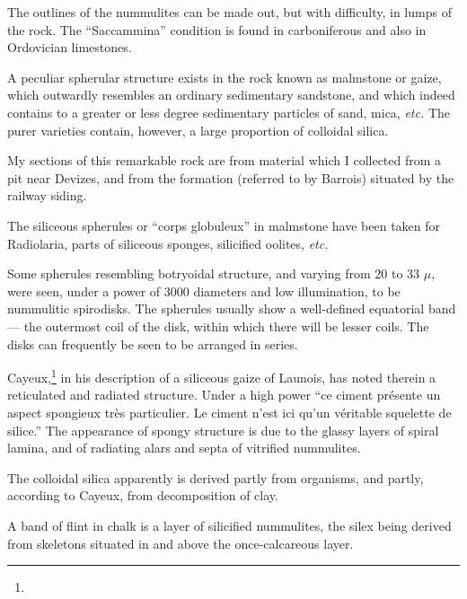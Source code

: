 \documentclass[a4paper, 12pt, oneside]{article}
\begin{document}
The outlines of the nummulites can be made out, but with difficulty, in lumps of the rock. The ``Saccammina'' condition is found in carboniferous and also in Ordovician limestones.

A peculiar spherular structure exists in the rock known as malmstone or gaize, which outwardly resembles an ordinary sedimentary sandstone, and which indeed contains to a greater or less degree sedimentary particles of sand, mica, \emph{etc.} The purer varieties contain, however, a large proportion of colloidal silica.

My sections of this remarkable rock are from material which I collected from a pit near Devizes, and from the formation (referred to by Barrois) situated by the railway siding.

The siliceous spherules or ``corps globuleux'' in malmstone have been taken for Radiolaria, parts of siliceous sponges, silicified oolites, \emph{etc.}

Some spherules resembling botryoidal structure, and varying from 20 to 33 $\mu$, were seen, under a power of 3000 diameters and low illumination, to be nummulitic spirodisks. The spherules usually show a well-defined equatorial band --- the outermost coil of the disk, within which there will be lesser coils. The disks can frequently be seen to be arranged in series.

Cayeux,\footnote{} in his description of a siliceous gaize of Launois, has noted therein a reticulated and radiated structure. Under a high power ``ce ciment présente un aspect spongieux très particulier. Le ciment n'est ici qu'un véritable squelette de silice.'' The appearance of spongy structure is due to the glassy layers of spiral lamina, and of radiating alars and septa of vitrified nummulites.

The colloidal silica apparently is derived partly from organisms, and partly, according to Cayeux, from decomposition of clay.

A band of flint in chalk is a layer of silicified nummulites, the silex being derived from skeletons situated in and above the once-calcareous layer.
\end{document}
